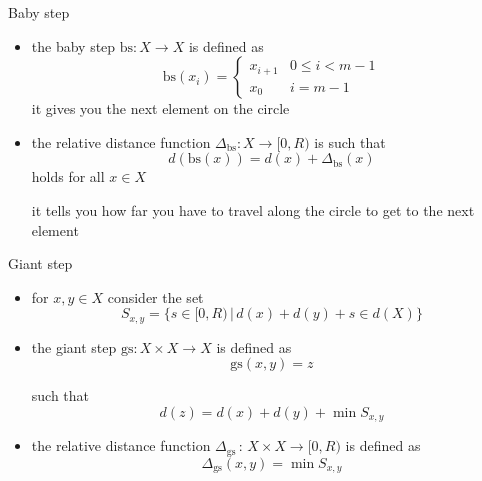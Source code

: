 \documentclass[slideColor]{prosper}
\renewcommand{\>}{\rangle}
\newcommand{\<}{\langle}
\begin{document}

\begin{slide}{Baby step}

\begin{itemize}
\vspace{-0.25cm}
\item the baby step $\mathrm{bs} : X \rightarrow X$ is defined as
\[
\mathrm{bs}(x_i) = \left\{
\begin{array}{ll}
x_{i+1} & 0 \le i < m-1 \\
x_0     & i=m-1
\end{array}
\right.
\]
\medskip
it gives you the next element on the circle

\medskip
\item the relative distance function $\Delta_{\mathrm{bs}} : X \rightarrow [0,R)$ is such that
\[
d(\mathrm{bs}(x)) = d(x) + \Delta_{\mathrm{bs}}(x)
\]
holds for all $x\in X$

\medskip
it tells you how far you have to travel along the circle to get to the next element
\end{itemize}

\end{slide}


\begin{slide}{Giant step}
\vspace{-0.25cm}
\begin{itemize}
\item for $x,y\in X$ consider the set
\[
S_{x,y} = \{ s \in [0,R) \, | \, d(x) + d(y) + s \in d(X) \}
\]

\medskip
\item the giant step $\mathrm{gs} : X \times X \rightarrow X$ is defined as
\[
\mathrm{gs}(x,y)=z 
\]

such that
\[
d(z) = d(x) + d(y) + \min S_{x,y}
\]

\medskip
\item the relative distance function $\Delta_{\mathrm{gs}} \, : \, X \times X \rightarrow [0,R)$ is defined as
\[
\Delta_{\mathrm{gs}}(x,y) = \min S_{x,y}
\]
\end{itemize}

\end{slide}

\end{document}
